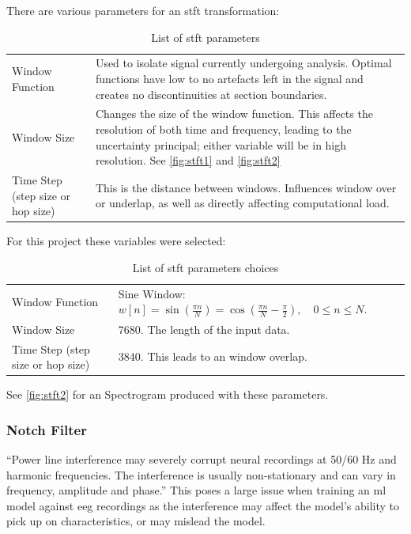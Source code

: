 \documentclass[12pt]{article}
\begin{document}
There are various parameters for an \acrshort{stft} transformation: 
\begin{table}[H]
\centering
\begin{tabular}{p{}p{}}
Window Function & Used to isolate signal currently undergoing analysis. Optimal functions have low to no artefacts left in the signal and creates no discontinuities at section boundaries.\\
Window Size & Changes the size of the window function. This affects the resolution of both time and frequency, leading to the uncertainty principal; either variable will be in high resolution. See \ref{fig:stft1} and \ref{fig:stft2} \\
Time Step (step size or hop size) & This is the distance between windows. Influences window over or underlap, as well as directly affecting computational load. \\                            
\end{tabular}
\caption{List of \acrfull{stft} parameters}
\label{tab:stft_params}
\end{table}

For this project these variables were selected:

\begin{table}[H]
\centering
\begin{tabular}{p{}p{}}
Window Function & Sine Window: $ w[n] = \sin\left(\frac{\pi n}{N}\right) = \cos\left(\frac{\pi n}{N} - \frac{\pi}{2}\right),\quad 0\le n \le N.$ \\
Window Size & 7680. The length of the input data. \\
Time Step (step size or hop size) & 3840. This leads to an window overlap. \\                            
\end{tabular}
\caption{List of \acrfull{stft} parameters choices}
\label{tab:stft_choices}
\end{table}

See \ref{fig:stft2} for an Spectrogram produced with these parameters. 

\subsubsection{Notch Filter}

``Power line interference may severely corrupt neural recordings at 50/60 Hz and harmonic frequencies. The interference is usually non-stationary and can vary in frequency, amplitude and phase.'' \cite{keshtkaran2014fast} This poses a large issue when training an \acrshort{ml} model against \acrshort{eeg} recordings as the interference may affect the model's ability to pick up on characteristics, or may mislead the model. 
\end{document}
